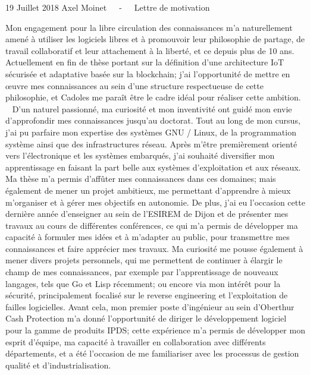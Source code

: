 \documentclass[11pt, a4paper]{awesome-cv}
\begin{document}
\makecvheader[R]

\makecvfooter
  {19 Juillet 2018}
  {Axel Moinet~~~-~~~Lettre de motivation}
  {}

\makelettertitle

\begin{cvletter}

  Mon engagement pour la libre circulation des connaissances m'a naturellement amené à utiliser les logiciels libres et à promouvoir leur philosophie de partage, de travail collaboratif et leur attachement à la liberté, et ce depuis plus de 10 ans. Actuellement en fin de thèse portant sur la définition d'une architecture IoT sécurisée et adaptative basée sur la blockchain; j'ai l'opportunité de mettre en \oe{}uvre mes connaissances au sein d'une structure respectueuse de cette philosophie, et Cadoles me paraît être le cadre idéal pour réaliser cette ambition.
~\vspace{-0.4cm}
D'un naturel passionné, ma curiosité et mon inventivité ont guidé mon envie d'approfondir mes connaissances jusqu'au doctorat. Tout au long de mon cursus, j'ai pu parfaire mon expertise des systèmes GNU / Linux, de la programmation système ainsi que des infrastructures réseau. Après m'être premièrement orienté vers l'électronique et les systèmes embarqués, j'ai souhaité diversifier mon apprentissage en faisant la part belle aux systèmes d'exploitation et aux réseaux. Ma thèse m'a permis d'affûter mes connaissances dans ces domaines; mais également de mener un projet ambitieux, me permettant d'apprendre à mieux m'organiser et à gérer mes objectifs en autonomie. De plus, j'ai eu l'occasion cette dernière année d'enseigner au sein de l'ESIREM de Dijon et de présenter mes travaux au cours de différentes conférences, ce qui m'a permis de développer ma capacité à formuler mes idées et à m'adapter au public, pour transmettre mes connaissances et faire apprécier mes travaux. Ma curiosité me pousse également à mener divers projets personnels, qui me permettent de continuer à élargir le champ de mes connaissances, par exemple par l'apprentissage de nouveaux langages, tels que Go et Lisp récemment; ou encore via mon intérêt pour la sécurité, principalement focalisé sur le reverse engineering et l'exploitation de failles logicielles. Avant cela, mon premier poste d'ingénieur au sein d'Oberthur Cash Protection m'a donné l'opportunité de diriger le développement logiciel pour la gamme de produits IPDS; cette expérience m'a permis de développer mon esprit d'équipe, ma capacité à travailler en collaboration avec différents départements, et a été l'occasion de me familiariser avec les processus de gestion qualité et d'industrialisation.

\end{cvletter}
\end{document}
